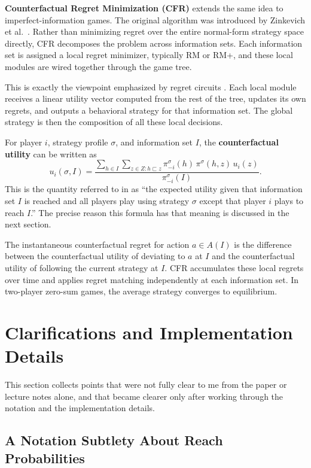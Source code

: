 \documentclass[11pt]{article}
\begin{document}
\textbf{Counterfactual Regret Minimization (CFR)} extends the same idea to imperfect-information games. The original algorithm was introduced by Zinkevich et al.\ \cite{zinkevich2007}. Rather than minimizing regret over the entire normal-form strategy space directly, CFR decomposes the problem across information sets. Each information set is assigned a local regret minimizer, typically RM or RM+, and these local modules are wired together through the game tree.

This is exactly the viewpoint emphasized by regret circuits \cite{farina2019}. Each local module receives a linear utility vector computed from the rest of the tree, updates its own regrets, and outputs a behavioral strategy for that information set. The global strategy is then the composition of all these local decisions.

For player $i$, strategy profile $\sigma$, and information set $I$, the \textbf{counterfactual utility} can be written as
\[
u_i(\sigma, I)
=
\frac{
\sum\limits_{h \in I}
\sum\limits_{z \in Z: h \sqsubset z}
\pi^\sigma_{-i}(h)\,\pi^\sigma(h, z)\,u_i(z)
}{
\pi^\sigma_{-i}(I)
}.
\]
This is the quantity referred to in \cite{zinkevich2007} as ``the expected utility given that information set $I$ is reached and all players play using strategy $\sigma$ except that player $i$ plays to reach $I$.'' The precise reason this formula has that meaning is discussed in the next section.

The instantaneous counterfactual regret for action $a \in A(I)$ is the difference between the counterfactual utility of deviating to $a$ at $I$ and the counterfactual utility of following the current strategy at $I$. CFR accumulates these local regrets over time and applies regret matching independently at each information set. In two-player zero-sum games, the average strategy converges to equilibrium.

\section{Clarifications and Implementation Details}

This section collects points that were not fully clear to me from the paper or lecture notes alone, and that became clearer only after working through the notation and the implementation details.

\subsection{A Notation Subtlety About Reach Probabilities}
\end{document}
